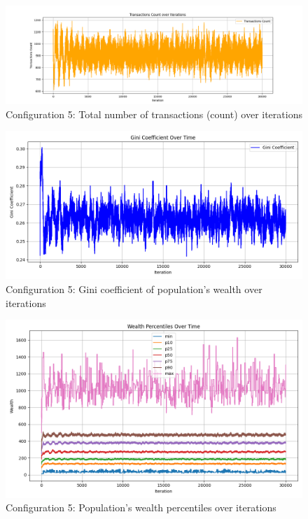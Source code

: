 \documentclass[english]{projectreport}
\begin{document}
    \begin{figure}[H]
        \centering
        \includegraphics[width=0.8\linewidth]{metrics_config5/metrics_config5_total_transactions_count.png}
        \caption{Configuration 5: Total number of transactions (count) over iterations}
        \label{fig:c0-total_transactions_count}
    \end{figure}

    \begin{figure}[H]
        \centering
        \includegraphics[width=0.8\linewidth]{metrics_config5/metrics_config5_gini_coefficient.png}
        \caption{Configuration 5: Gini coefficient of population's wealth over iterations}
        \label{fig:c0-gini_coefficient}
    \end{figure}

    \begin{figure}[H]
        \centering
        \includegraphics[width=0.8\linewidth]{metrics_config5/metrics_config5_wealth_perc_time.png}
        \caption{Configuration 5: Population's wealth percentiles over iterations}
        \label{fig:c0-wealth_perc_time}
    \end{figure}
\end{document}

